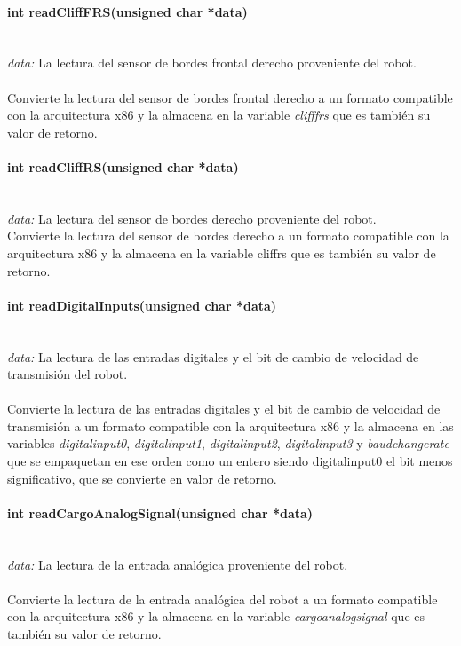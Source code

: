 \documentclass[letterpaper,openright,12pt]{book}
\begin{document}
\paragraph{int readCliffFRS(unsigned char *data)}\mbox{}\\
\emph{data: }La lectura del sensor de bordes frontal derecho proveniente del robot.\\\\
Convierte la lectura del sensor de bordes frontal derecho a un formato compatible con la arquitectura x86 y la almacena en la variable \emph{clifffrs} que es también su valor de retorno.\\ 

\paragraph{int readCliffRS(unsigned char *data)}\mbox{}\\
\emph{data: }La lectura del sensor de bordes derecho proveniente del robot.\\
Convierte la lectura del sensor de bordes derecho a un formato compatible con la arquitectura x86 y la almacena en la variable cliffrs que es también su valor de retorno.\\ 

\paragraph{int readDigitalInputs(unsigned char *data)}\mbox{}\\
\emph{data: }La lectura de las entradas digitales y el bit de cambio de velocidad de transmisión del robot.\\\\
Convierte la lectura de las entradas digitales y el bit de cambio de velocidad de transmisión a un formato compatible con la arquitectura x86 y la almacena en las variables \emph{digitalinput0}, \emph{digitalinput1}, \emph{digitalinput2}, \emph{digitalinput3} y \emph{baudchangerate} que se empaquetan en ese orden como un entero siendo digitalinput0 el bit menos significativo, que se convierte en valor de retorno.\\ 

\paragraph{int readCargoAnalogSignal(unsigned char *data)}\mbox{}\\
\emph{data: }La lectura de la entrada analógica proveniente del robot.\\\\
Convierte la lectura de la entrada analógica del robot a un formato compatible con la arquitectura x86 y la almacena en la variable \emph{cargoanalogsignal} que es también su valor de retorno.\\ 
\end{document}
